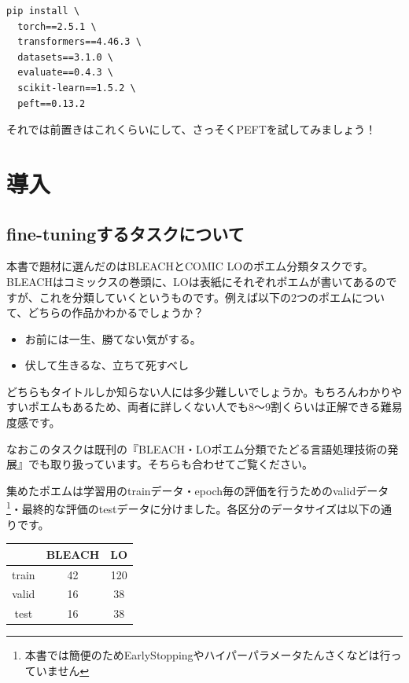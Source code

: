 \documentclass[a5paper,twoside,dvipdfmx]{jsarticle}
\begin{document}
\begin{lstlisting}
pip install \
  torch==2.5.1 \
  transformers==4.46.3 \
  datasets==3.1.0 \
  evaluate==0.4.3 \
  scikit-learn==1.5.2 \
  peft==0.13.2
\end{lstlisting}

それでは前置きはこれくらいにして、さっそくPEFTを試してみましょう！

\newpage

\section{導入}

\subsection{fine-tuningするタスクについて}

本書で題材に選んだのはBLEACHとCOMIC LOのポエム分類タスクです。BLEACHはコミックスの巻頭に、LOは表紙にそれぞれポエムが書いてあるのですが、これを分類していくというものです。例えば以下の2つのポエムについて、どちらの作品かわかるでしょうか？

\begin{itemize}
  \item お前には一生、勝てない気がする。
  \item 伏して生きるな、立ちて死すべし
\end{itemize}

どちらもタイトルしか知らない人には多少難しいでしょうか。もちろんわかりやすいポエムもあるため、両者に詳しくない人でも8～9割くらいは正解できる難易度感です。

なおこのタスクは既刊の『BLEACH・LOポエム分類でたどる言語処理技術の発展』でも取り扱っています。そちらも合わせてご覧ください。

集めたポエムは学習用のtrainデータ・epoch毎の評価を行うためのvalidデータ\footnote{本書では簡便のためEarlyStoppingやハイパーパラメータたんさくなどは行っていません}・最終的な評価のtestデータに分けました。各区分のデータサイズは以下の通りです。

\begin{table}[htbp]
  \centering
  \begin{tabular}{|c|c|c|}
    \hline
     & BLEACH & LO \\
    \hline
    train & 42 & 120 \\
    \hline
    valid & 16 & 38 \\
    \hline
    test & 16 & 38  \\
    \hline
  \end{tabular}
\end{table}
\end{document}
